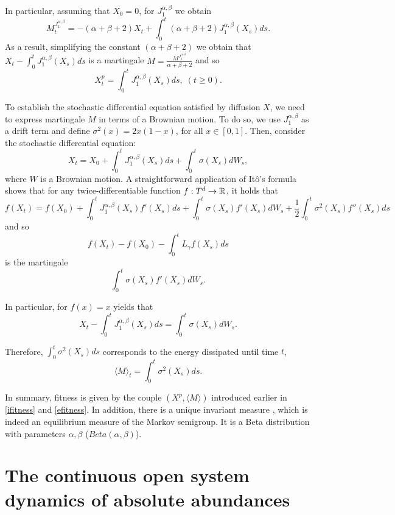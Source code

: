 \documentclass[12pt]{article}
\begin{document}
 In particular, assuming that $X_0=0$, for $J_1^{\alpha,\beta}$ we obtain
\[M^{J^{\alpha,\beta}_1}_t=-(\alpha+\beta+2)X_t+\int_0^t(\alpha+\beta+2)J^{\alpha,\beta}_1(X_s)ds.\]
As a result, simplifying the constant $(\alpha+\beta+2)$ we obtain that $X_t-\int_0^tJ_1^{\alpha,\beta}(X_s)ds$ is a martingale $M=\frac{M^{J^{\alpha,\beta}_1}}{\alpha+\beta+2}$ and so
\begin{equation}\label{ifitness}
    X^p_t=\int_0^tJ_1^{\alpha,\beta}(X_s)ds,\;(t\geq 0).
\end{equation} 

To establish the stochastic differential equation satisfied by diffusion $X$, we need to express martingale $M$ in terms of a Brownian motion. To do so, we use $J^{\alpha,\beta}_1$ as a drift term and define $\sigma^2(x)=2x(1-x)$, for all $x\in [0,1]$. Then, consider
the stochastic differential equation:
\begin{equation}\label{jacobi-1}
    X_t=X_0+\int_0^tJ_1^{\alpha,\beta}(X_s)ds+\int_0^t\sigma (X_s)dW_s,
\end{equation}
where $W$ is a Brownian motion. A straightforward application of It\^o's formula shows that for any twice-differentiable function $f:T^d\to{\mathbb R}^{}$, it holds that
\begin{equation}
    f(X_t)=f(X_0)+\int_0^tJ_1^{\alpha,\beta}(X_s)f'(X_s)ds+\int_0^t\sigma (X_s)f'(X_s)dW_s+\frac{1}{2}\int_0^t\sigma^2(X_s)f''(X_s)ds
\end{equation}
and so
\[f(X_t)-f(X_0)-\int_0^tL_\gamma f(X_s)ds\]
is the martingale
\[\int_0^t\sigma (X_s)f'(X_s)dW_s.\]

In particular, for $f(x)=x$ yields that
\[X_t-\int_0^tJ_1^{\alpha,\beta}(X_s)ds=\int_0^t\sigma (X_s)dW_s.\]



Therefore, $\int_0^t \sigma^2(X_s)ds$ corresponds to the energy dissipated until time $t$,
\begin{equation}\label{efitness}
    \langle M\rangle_t=\int_0^t \sigma^2(X_s)ds.
\end{equation}

In summary, fitness is given by the couple $(X^p,\langle M\rangle)$ introduced earlier in \eqref{ifitness} and \eqref{efitness}. In addition, there is a unique invariant measure , which is indeed an equilibrium measure of the Markov semigroup. It is a Beta distribution with parameters $\alpha,\beta$ ($Beta(\alpha,\beta)$). 






\section{The continuous open system dynamics of absolute abundances}\label{sec:ab-ab}
\end{document}
